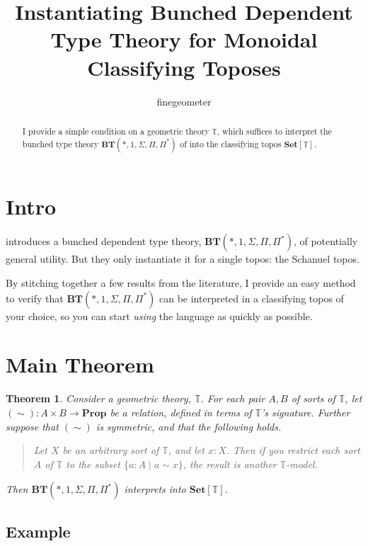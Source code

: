 \documentclass{article}
\title{Instantiating Bunched Dependent Type Theory for Monoidal Classifying Toposes}
\author{finegeometer}
\newtheorem{theorem}{Theorem}[section]
\newcommand*{\Prop}{\mathbf{Prop}}
\newcommand*{\Set}{\mathbf{Set}}
\newcommand*{\T}{\mathbb{T}}
\begin{document}
\maketitle

\begin{abstract}
    I provide a simple condition on a geometric theory \(\T\),
    which suffices to interpret the bunched type theory \(\mathbf{BT}(*, 1, \Sigma, \Pi, \Pi^*)\) of \cite{schopp} into the classifying topos \(\Set[\T]\).
\end{abstract}

\section{Intro}

\cite{schopp} introduces a bunched dependent type theory, \(\mathbf{BT}(*, 1, \Sigma, \Pi, \Pi^*)\),
of potentially general utility. But they only instantiate it for a single topos: the Schanuel topos.

By stitching together a few results from the literature,
I provide an easy method to verify that \(\mathbf{BT}(*, 1, \Sigma, \Pi, \Pi^*)\)
can be interpreted in a classifying topos of your choice,
so you can start \emph{using} the language as quickly as possible.

\section{Main Theorem}

\begin{theorem}
    Consider a geometric theory, \(\T\).
    For each pair \(A,B\) of sorts of \(\T\), let \((\sim) : A \times B \to \Prop\) be a relation, defined in terms of \(\T\)'s signature.
    Further suppose that \((\sim)\) is symmetric, and that the following holds.

    \begin{quote}
        Let \(X\) be an arbitrary sort of \(\T\), and let \(x : X\).
        Then if you restrict each sort \(A\) of \(\T\) to the subset \(\{a : A \mid a \sim x\}\),
        the result is another \(\T\)-model.
    \end{quote}

    \noindent Then \(\mathbf{BT}(*, 1, \Sigma, \Pi, \Pi^*)\) interprets into \(\Set[\T]\).
\end{theorem}

\subsection{Example}
\end{document}
